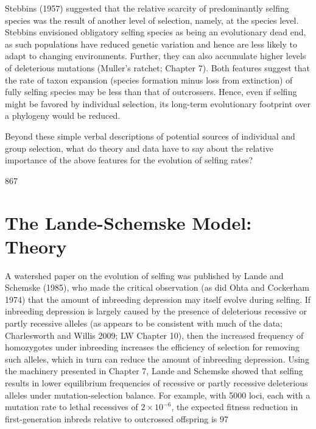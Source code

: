 \documentclass{article}
\begin{document}
Stebbins (1957) suggested that the relative scarcity of predominantly selfing species was the result of another level of selection, namely, at the species level. Stebbins envisioned obligatory selfing species as being an evolutionary dead end, as such populations have reduced genetic variation and hence are less likely to adapt to changing environments. Further, they can also accumulate higher levels of deleterious mutations (Muller's ratchet; Chapter 7). Both features suggest that the rate of taxon expansion (species formation minus loss from extinction) of fully selfing species may be less than that of outcrossers. Hence, even if selfing might be favored by individual selection, its long-term evolutionary footprint over a phylogeny would be reduced.

Beyond these simple verbal descriptions of potential sources of individual and group selection, what do theory and data have to say about the relative importance of the above features for the evolution of selfing rates?

867

\section{The Lande-Schemske Model: Theory}
A watershed paper on the evolution of selfing was published by Lande and Schemske (1985), who made the critical observation (as did Ohta and Cockerham 1974) that the amount of inbreeding depression may itself evolve during selfing. If inbreeding depression is largely caused by the presence of deleterious recessive or partly recessive alleles (as appears to be consistent with much of the data; Charlesworth and Willis 2009; LW Chapter 10), then the increased frequency of homozygotes under inbreeding increases the efficiency of selection for removing such alleles, which in turn can reduce the amount of inbreeding depression. Using the machinery presented in Chapter 7, Lande and Schemske showed that selfing results in lower equilibrium frequencies of recessive or partly recessive deleterious alleles under mutation-selection balance. For example, with 5000 loci, each with a mutation rate to lethal recessives of  $ 2 \times 10^{-6} $, the expected fitness reduction in first-generation inbreds relative to outcrossed offspring is 97%
\end{document}
